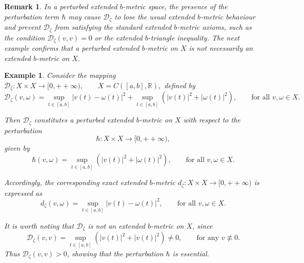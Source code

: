 \documentclass[sn-mathphys-num]{sn-jnl}%
\theoremstyle{thmstyleone}%
\theoremstyle{thmstyletwo}%
\newtheorem{example}{Example}%
\newtheorem{remark}{Remark}%
\theoremstyle{thmstylethree}%
\numberwithin{equation}{section}
\begin{document}
\begin{remark}
In a perturbed extended $b$-metric space, the presence of the perturbation term 
$\hbar$ may cause $\mathcal{D}_{\zeta}$ to lose the usual extended $b$-metric 
behaviour and prevent $\mathcal{D}_{\zeta}$ from satisfying the standard 
extended $b$-metric axioms, such as the condition $\mathcal{D}_{\zeta}(v,v)=0$ 
or the extended $b$-triangle inequality. The next example confirms that a 
perturbed extended $b$-metric on $X$ is not necessarily an extended $b$-metric 
on $X$.
\end{remark}
\vspace{0.2cm}
\begin{example}
Consider the mapping \(
\mathcal{D}_{\zeta} : X \times X \longrightarrow [0,++\infty),
\qquad X = C([a,b],\mathbb{R}),
\)
defined by
\[
\mathcal{D}_{\zeta}(v,\omega)
=
\sup_{t \in [a,b]} |v(t) - \omega(t)|^{2}
+
\sup_{t \in [a,b]} \left( |v(t)|^{2} + |\omega(t)|^{2} \right),
\qquad \text{for all } v,\omega \in X.
\]

Then $\mathcal{D}_{\zeta}$ constitutes a perturbed extended $b$-metric on $X$ 
with respect to the perturbation 
\[
\hbar : X \times X \longrightarrow [0,++\infty),
\]
given by
\[
\hbar(v,\omega)
=
\sup_{t \in [a,b]}
\left( |v(t)|^{2} + |\omega(t)|^{2} \right),
\qquad \text{for all } v,\omega \in X.
\]

Accordingly, the corresponding exact extended $b$-metric \(
d_{\zeta} : X \times X \longrightarrow [0,++\infty)
\)
is expressed as
\[
d_{\zeta}(v,\omega)
=
\sup_{t \in [a,b]} |v(t) - \omega(t)|^{2},
\qquad \text{for all } v,\omega \in X.
\]

It is worth noting that $\mathcal{D}_{\zeta}$ is not an extended $b$-metric on $X$, since
\[
\mathcal{D}_{\zeta}(v,v)
=
\sup_{t \in [a,b]} \left( |v(t)|^{2} + |v(t)|^{2} \right)
\neq 0,
\qquad \text{for any } v \not\equiv 0.
\]
Thus $\mathcal{D}_{\zeta}(v,v) > 0$, showing that the perturbation $\hbar$ is essential.
\end{example}
\end{document}
